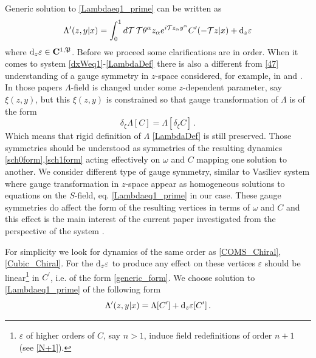 \documentclass[12pt]{article}
\newcommand{\dr}{{{\rm d}}}
\newcommand{\go}{\omega}
\begin{document}
Generic solution to \eqref{Lambdaeq1_prime} can be written as 
\begin{equation}\label{47}
\Lambda^\prime(z,y|x)=\int_0^1 d\mathcal{T}\, \mathcal{T} \theta^\alpha z_\alpha e^{i\mathcal{T}z_\alpha y^\alpha}C^\prime(-\mathcal{T}z|x)+\dr_z\varepsilon
\end{equation}
where $\dr_z\varepsilon\in \mathbf{C}^{1,\mathfrak{P}}$. Before we proceed some clarifications are in order. When it comes to system \eqref{dxWeq1}-\eqref{LambdaDef} there is also a different from \eqref{47} understanding of a gauge symmetry in $z$-space considered, for example, in \cite{Faliakhov:2026yum} and \cite{Didenko:2023vna}. In those papers $\Lambda$-field is changed under some $z$-dependent parameter, say $\xi(z,y)$, but this $\xi(z,y)$ is constrained so that gauge transformation of $\Lambda$ is of the form
\begin{equation}
\delta_\xi\Lambda[C]=\Lambda[\delta_\xi C]\,.
\end{equation}
Which means that rigid definition of $\Lambda$ \eqref{LambdaDef} is still preserved. Those symmetries should be understood as symmetries of the  resulting dynamics \eqref{sch0form},\eqref{sch1form} acting effectively on $\go$ and $C$ mapping one solution to another. We consider different type of gauge symmetry, similar to Vasiliev system where gauge transformation in $z$-space appear as homogeneous solutions to equations on the $S$-field, eq. \eqref{Lambdaeq1_prime} in our case. These gauge symmetries do affect the form of the resulting vertices in terms of $\go$ and $C$ and this effect is the main interest of the current paper investigated from the perspective of the system \cite{Didenko:2022qga}.
 
For simplicity we look for dynamics of the same order as \eqref{COMS_Chiral}, \eqref{Cubic_Chiral}. For the $\dr_z \varepsilon$ to produce any effect on these vertices $\varepsilon$ should be linear\footnote{$\varepsilon$ of higher orders of $C$, say $n>1$, induce field redefinitions of order $n+1$ (see \eqref{N+1}).} in $C^\prime$, i.e. of the form \eqref{generic_form}. We choose solution to \eqref{Lambdaeq1_prime} of the following form 
\begin{equation}\label{Lambda_prime}
\Lambda^\prime(z,y|x)=\Lambda[C^\prime]+\dr_z \varepsilon[C^\prime]\,.
\end{equation}
\end{document}
